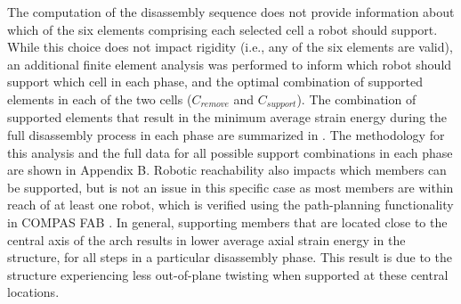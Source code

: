     \newpage
    The computation of the disassembly sequence does not provide information about which of the six elements comprising each selected cell a robot should support. While this choice does not impact rigidity (i.e., any of the six elements are valid), an additional finite element analysis was performed to inform which robot should support which cell in each phase, and the optimal combination of supported elements in each of the two cells ($C_{remove}$ and $C_{support}$). The combination of supported elements that result in the minimum average strain energy during the full disassembly process in each phase are summarized in . The methodology for this analysis and the full data for all possible support combinations in each phase are shown in Appendix B. Robotic reachability also impacts which members can be supported, but is not an issue in this specific case as most members are within reach of at least one robot, which is verified using the path-planning functionality in COMPAS FAB \citep{mele_compas_2017}. In general, supporting members that are located close to the central axis of the arch results in lower average axial strain energy in the structure, for all steps in a particular disassembly phase. This result is due to the structure experiencing less out-of-plane twisting when supported at these central locations.

